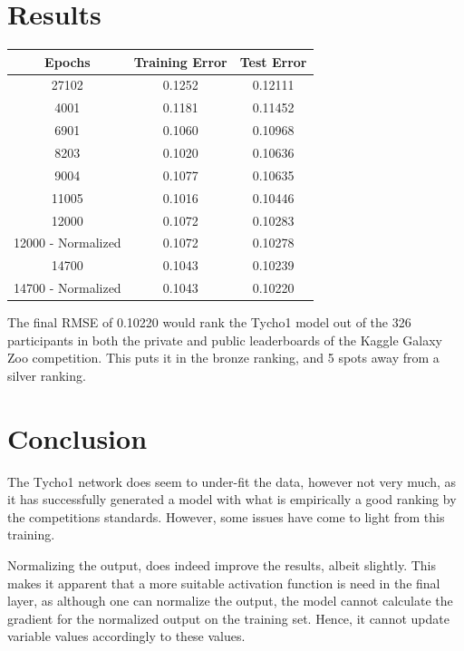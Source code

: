 \documentclass[12pt,a4paper,oneside,oldfontcommands]{memoir}
\begin{document}
\section{Results}


\begin{center}
 \begin{tabular}{||c | c | c||} 
 \hline
 Epochs & Training Error & Test Error \\ [0.5ex] 
 \hline\hline
 27102 & 0.1252 & 0.12111\\ 
 \hline
 4001 & 0.1181 & 0.11452\\
 \hline
 6901 & 0.1060 & 0.10968\\
 \hline
 8203 & 0.1020 & 0.10636\\
 \hline
 9004 & 0.1077 & 0.10635\\ 
 \hline
 11005 & 0.1016 & 0.10446\\ 
 \hline
 12000 & 0.1072 & 0.10283\\ 
 \hline
 12000 - Normalized & 0.1072 & 0.10278\\
 \hline
 14700 & 0.1043 & 0.10239\\ 
 \hline
 14700 - Normalized & 0.1043 & 0.10220\\ [1ex] 
 \hline
\end{tabular}
\end{center}

The final RMSE of 0.10220 would rank the Tycho1 model  out of the 326 participants in both the private and public leaderboards of the Kaggle Galaxy Zoo competition. This puts it in the bronze ranking, and 5 spots away from a silver ranking. 

\section{Conclusion}

The Tycho1 network does seem to under-fit the data, however not very much, as it has successfully generated a model with what is empirically a good ranking by the competitions standards. However, some issues have come to light from this training.

Normalizing the output, does indeed improve the results, albeit slightly. This makes it apparent that a more suitable activation function is need in the final layer, as although one can normalize the output, the model cannot calculate the gradient for the normalized output on the training set. Hence, it cannot update variable values accordingly to these values. 
\end{document}
